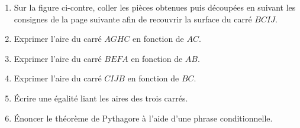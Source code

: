 \begin{activite}
    \begin{minipage}{0.4\linewidth}
        \begin{enumerate}
            \item Sur la figure ci-contre, coller les pièces     
            obtenues puis découpées en suivant les consignes de la page suivante afin de recouvrir la surface du carré $BCIJ$.
            \item Exprimer l'aire du carré $AGHC$ en fonction de $AC$.\smallskip\\\makebox[\linewidth]{\dotfill}
            \item Exprimer l'aire du carré $BEFA$ en fonction de $AB$.\smallskip\\\makebox[\linewidth]{\dotfill}
            \item Exprimer l'aire du carré $CIJB$ en fonction de $BC$.\smallskip\\\makebox[\linewidth]{\dotfill}
            \item Écrire une égalité liant les aires des trois carrés.\smallskip\\\makebox[\linewidth]{\dotfill}
            \item Énoncer le théorème de Pythagore à l'aide d'une phrase conditionnelle.\smallskip\\\makebox[1.7\linewidth]{\dotfill}\medskip\\\makebox[1.7\linewidth]{\dotfill}\medskip\\\makebox[1.7\linewidth]{\dotfill}
        \end{enumerate}
    \end{minipage}
    \hfill
    \begin{minipage}{0.55\linewidth}
\end{minipage}
\end{activite}
